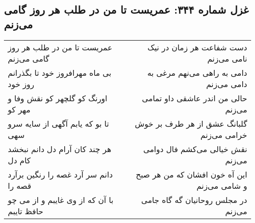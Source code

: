 \begin{center}
\section*{غزل شماره ۳۴۴: عمریست تا من در طلب هر روز گامی می‌زنم}
\label{sec:sh344}
\begin{longtable}{l p{0.5cm} r}
عمریست تا من در طلب هر روز گامی می‌زنم
&&
دست شفاعت هر زمان در نیک نامی می‌زنم
\\
بی ماه مهرافروز خود تا بگذرانم روز خود
&&
دامی به راهی می‌نهم مرغی به دامی می‌زنم
\\
اورنگ کو گلچهر کو نقش وفا و مهر کو
&&
حالی من اندر عاشقی داو تمامی می‌زنم
\\
تا بو که یابم آگهی از سایه سرو سهی
&&
گلبانگ عشق از هر طرف بر خوش خرامی می‌زنم
\\
هر چند کان آرام دل دانم نبخشد کام دل
&&
نقش خیالی می‌کشم فال دوامی می‌زنم
\\
دانم سر آرد غصه را رنگین برآرد قصه را
&&
این آه خون افشان که من هر صبح و شامی می‌زنم
\\
با آن که از وی غایبم و از می چو حافظ تایبم
&&
در مجلس روحانیان گه گاه جامی می‌زنم
\\
\end{longtable}
\end{center}
